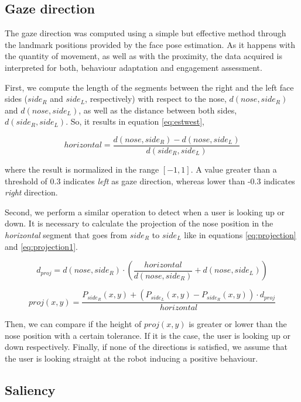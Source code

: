 \subsection{Gaze direction}
The gaze direction was computed using a simple but effective method through the landmark positions provided by the face pose estimation. As it happens with the quantity of movement, as well as with the proximity, the data acquired is interpreted for both, behaviour adaptation and engagement assessment.

First, we compute the length of the segments between the right and the left face sides ($ side_R $ and $ side_L $, respectively) with respect to the nose, $ d(nose,side_R) $ and $ d(nose,side_L) $, as well as the distance between both sides, $ d(side_R,side_L) $. So, it results in equation \ref{eq:estwest},

\begin{equation} \label{eq:estwest}
horizontal = \frac{d(nose,side_R)-d(nose,side_L)}{d(side_R,side_L)}
\end{equation}

where the result is normalized in the range $ [-1,1] $. A value greater than a threshold of 0.3 indicates \textit{left} as gaze direction, whereas lower than -0.3 indicates \textit{right} direction.

Second, we perform a similar operation to detect when a user is looking up or down. It is necessary to calculate the projection of the nose position in the \textit{horizontal} segment that goes from $ side_R $ to $side_L$ like in equations \ref{eq:projection} and \ref{eq:projection1}.

\begin{equation}\label{eq:projection}
d_{proj} = d(nose,side_R) \cdot \left(\frac{horizontal}{d(nose,side_R)} + d(nose,side_L)\right )
\end{equation}

\begin{equation} \label{eq:projection1}
proj(x,y) = \frac{P_{side_R}(x,y)+(P_{side_L}(x,y)-P_{side_R}(x,y))\cdot d_{proj}}{horizontal}
\end{equation}

Then, we can compare if the height of $ proj(x,y) $ is greater or lower than the nose position with a certain tolerance. If it is the case, the user is looking up or down respectively. Finally, if none of the directions is satisfied, we assume that the user is looking straight at the robot inducing a positive behaviour.


\subsection{Saliency}

